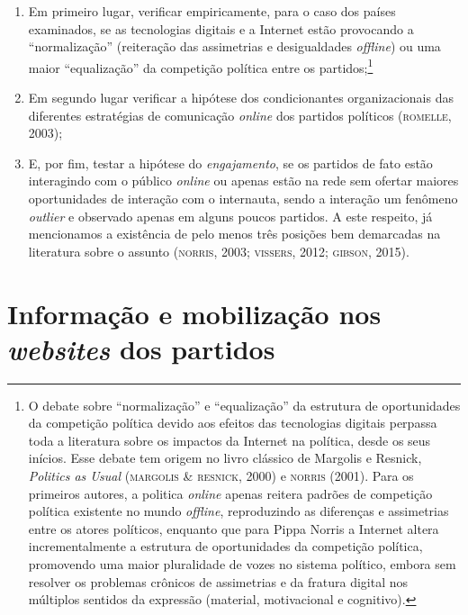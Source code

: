 \begin{enumerate}
\item Em primeiro lugar, verificar empiricamente, para o caso dos países
examinados, se as tecnologias digitais e a Internet estão provocando a
``normalização'' (reiteração das assimetrias e desigualdades \textit{offline})
ou uma maior ``equalização'' da competição política entre os
partidos;\footnote{O debate sobre ``normalização'' e ``equalização'' da
  estrutura de oportunidades da competição política devido aos efeitos
  das tecnologias digitais perpassa toda a literatura sobre os impactos
  da Internet na política, desde os seus inícios. Esse debate tem origem
  no livro clássico de Margolis e Resnick, \textit{Politics as Usual}
  (\textsc{margolis \& resnick}, 2000) e \textsc{norris} (2001). Para os primeiros
  autores, a politica \textit{online} apenas reitera padrões de competição
  política existente no mundo \textit{offline}, reproduzindo as diferenças
  e assimetrias entre os atores políticos, enquanto que para Pippa
  Norris a Internet altera incrementalmente a estrutura de oportunidades
  da competição política, promovendo uma maior pluralidade de vozes no
  sistema político, embora sem resolver os problemas crônicos de
  assimetrias e da fratura digital nos múltiplos sentidos da expressão
  (material, motivacional e cognitivo).}

\item Em segundo lugar verificar a hipótese dos condicionantes
organizacionais das diferentes estratégias de comunicação \textit{online} dos
partidos políticos (\textsc{romelle}, 2003);

\item E, por fim, testar a hipótese do \textit{engajamento}, se os
partidos de fato estão interagindo com o público \textit{online} ou apenas estão
na rede sem ofertar maiores oportunidades de interação com o internauta,
sendo a interação um fenômeno \textit{outlier} e observado apenas em alguns
poucos partidos. A este respeito, já mencionamos a existência de pelo
menos três posições bem demarcadas na literatura sobre o assunto
(\textsc{norris}, 2003; \textsc{vissers}, 2012; \textsc{gibson}, 2015).
\end{enumerate}

\section{Informação e mobilização nos \textit{websites} dos partidos}

